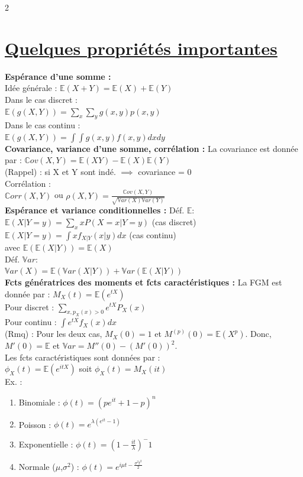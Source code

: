 \documentclass[11pt]{article}
\begin{document}
\begin{multicols}{2}
  \section{\underline{Quelques propriétés importantes}}

  \textbf{Espérance d'une somme :}\\
  Idée générale : $\mathbb{E}(X+Y)=\mathbb{E}(X)+\mathbb{E}(Y)$\\
  Dans le cas discret : \\$\mathbb{E}(g(X,Y)) = \sum_{x}\sum_{y}g(x,y)p(x,y)$\\
  Dans le cas continu : \\$\mathbb{E}(g(X,Y))=\int\int g(x,y)f(x,y)dxdy$\\

  \textbf{Covariance, variance d'une somme, corrélation :} 
  La covariance est donnée par : $\mathbb{C}ov(X,Y)=\mathbb{E}(XY)-\mathbb{E}(X)\mathbb{E}(Y)$\\
  (Rappel) : si X et Y sont indé. $\implies$ covariance = 0\\
  Corrélation : \\$\mathbb{C}orr(X,Y)$ ou $\rho(X,Y)=\frac{\mathbb{C}ov(X,Y)}{\sqrt{\mathbb{V}ar(X)\mathbb{V}ar(Y)}}$\\

  \textbf{Espérance et variance conditionnelles :}
  Déf. $\mathbb{E}$:\\
  $\mathbb{E}(X|Y=y)=\sum_{x}xP(X=x|Y=y)$ (cas discret)\\
  $\mathbb{E}(X|Y=y)=\int xf_{X|Y}(x|y)dx$ (cas continu)\\
  avec $\mathbb{E}(\mathbb{E}(X|Y))=\mathbb{E}(X)$\\
  Déf. $\mathbb{V}ar$:\\
  $\mathbb{V}ar(X)=\mathbb{E}(\mathbb{V}ar(X|Y))+\mathbb{V}ar(\mathbb{E}(X|Y))$\\
  
  \textbf{Fcts génératrices des moments et fcts caractéristiques :}
  La FGM est donnée par : $M_X(t)=\mathbb{E}(e^{tX})$\\
  Pour discret : $\sum_{x,p_X(x)>0}e^{tX}P_X(x)$\\
  Pour continu : $\int e^{tX}f_X(x)dx$\\
  (Rmq) : Pour les deux cas, $M_X(0)=1$ et $M^{(p)}(0)=\mathbb{E}(X^p)$.
  Donc,\\
  $M'(0)=\mathbb{E}$ et $\mathbb{V}ar=M''(0)-(M'(0))^2$.\\
  Les fcts caractéristiques sont données par : \\$\phi_X(t)=\mathbb{E}(e^{itX})$ soit $\phi_X(t)=M_X(it)$\\
  Ex. :\\
  \begin{enumerate}
    \item Binomiale : $\phi(t)=(pe^{it}+1-p)^n$
    \item Poisson : $\phi(t)=e^{\lambda(e^{it}-1)}$
    \item Exponentielle : $\phi(t)=(1-\frac{it}{\lambda})^-1$
    \item Normale ($\mu$,$\sigma^2$) : $\phi(t)=e^{i\mu t-\frac{\sigma^2 t^2}{2}}$
  \end{enumerate}



\end{multicols}
\end{document}
